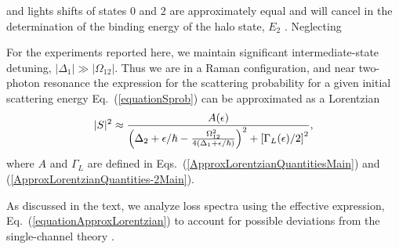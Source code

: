 
and lights shifts of states 0 and 2 are approximately equal and will cancel in the determination of the binding energy of the halo state, $E_2$ \cite{rbm04,rfk87}. Neglecting


For the experiments reported here, we maintain significant intermediate-state detuning, $|\Delta_1|\gg |\Omega_{12}|$. Thus we are in a Raman configuration, and near two-photon resonance the expression for the scattering probability for a given initial scattering energy Eq.~(\ref{equationSprob}) can be approximated as a Lorentzian
\begin{eqnarray}\label{equationSprobLorentzian}
 \vert S\vert^2 \approx {A(\epsilon) \over
 \left(\Delta_2+\epsilon/\hbar-\frac{\Omega_{12}^{2}}{4(\Delta_1+\epsilon/\hbar)}\right)^2+\left[ {\Gamma_L(\epsilon)}/{2}\right]^2},
\end{eqnarray}
where $A$ and $\Gamma_L$ are defined in Eqs.\ (\ref{ApproxLorentzianQuantitiesMain}) and (\ref{ApproxLorentzianQuantities-2Main}).

As discussed in the text, we analyze loss spectra using the effective expression, Eq.\ (\ref{equationApproxLorentzian}) to account for possible deviations from the single-channel theory \cite{bju96}.

